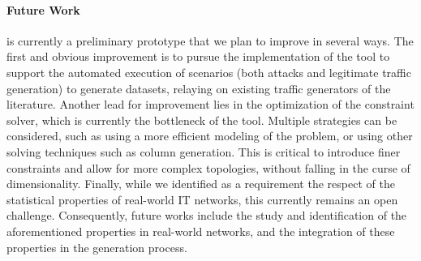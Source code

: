 \paragraph{Future Work}

\thecontrib is currently a preliminary prototype that we plan to improve in several ways.
The first and obvious improvement is to pursue the implementation of the tool to support the automated execution of scenarios (both attacks and legitimate traffic generation) to generate datasets, relaying on existing traffic generators of the literature.
Another lead for improvement lies in the optimization of the constraint solver, which is currently the bottleneck of the tool.
Multiple strategies can be considered, such as using a more efficient modeling of the problem, or using other solving techniques such as column generation.
This is critical to introduce finer constraints and allow for more complex topologies, without falling in the curse of dimensionality.
Finally, while we identified as a requirement the respect of the statistical properties of real-world IT networks, this currently remains an open challenge.
Consequently, future works include the study and identification of the aforementioned properties in real-world networks, and the integration of these properties in the generation process.
